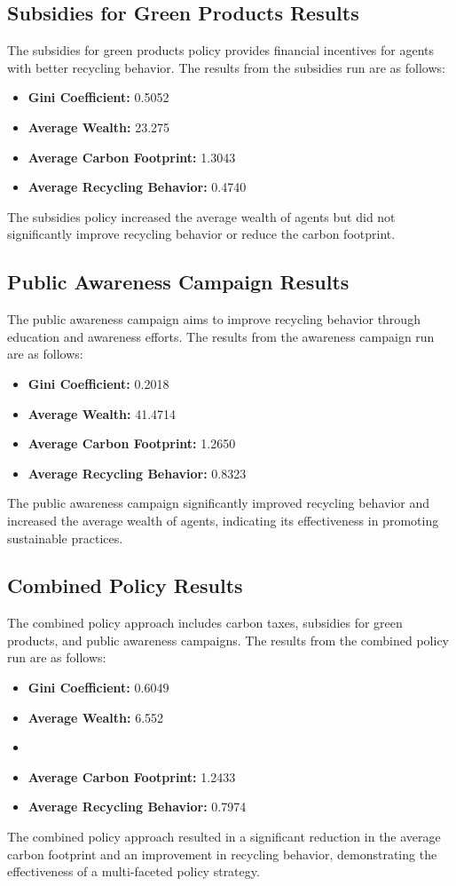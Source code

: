 \documentclass{article} %
\begin{document}
\subsection{Subsidies for Green Products Results}
The subsidies for green products policy provides financial incentives for agents with better recycling behavior. The results from the subsidies run are as follows:
\begin{itemize}
    \item \textbf{Gini Coefficient:} 0.5052
    \item \textbf{Average Wealth:} 23.275
    \item \textbf{Average Carbon Footprint:} 1.3043
    \item \textbf{Average Recycling Behavior:} 0.4740
\end{itemize}
The subsidies policy increased the average wealth of agents but did not significantly improve recycling behavior or reduce the carbon footprint.

\subsection{Public Awareness Campaign Results}
The public awareness campaign aims to improve recycling behavior through education and awareness efforts. The results from the awareness campaign run are as follows:
\begin{itemize}
    \item \textbf{Gini Coefficient:} 0.2018
    \item \textbf{Average Wealth:} 41.4714
    \item \textbf{Average Carbon Footprint:} 1.2650
    \item \textbf{Average Recycling Behavior:} 0.8323
\end{itemize}
The public awareness campaign significantly improved recycling behavior and increased the average wealth of agents, indicating its effectiveness in promoting sustainable practices.

\subsection{Combined Policy Results}
The combined policy approach includes carbon taxes, subsidies for green products, and public awareness campaigns. The results from the combined policy run are as follows:
\begin{itemize}
    \item \textbf{Gini Coefficient:} 0.6049
    \item \textbf{Average Wealth:} 6.552
    \item \item \textbf{Average Carbon Footprint:} 1.2433
    \item \textbf{Average Recycling Behavior:} 0.7974
\end{itemize}
The combined policy approach resulted in a significant reduction in the average carbon footprint and an improvement in recycling behavior, demonstrating the effectiveness of a multi-faceted policy strategy.
\end{document}

